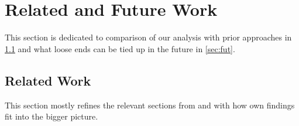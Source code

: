 \chapter{Related and Future Work}\label{sec:relfut}

This section is dedicated to comparison of our analysis with prior approaches in \cref{sec:rel} and what loose ends can be tied up in the future in \cref{sec:fut}.

\section{Related Work}\label{sec:rel}

This section mostly refines the relevant sections from \textcite{callarity} and \textcite{card} with how own findings fit into the bigger picture.
